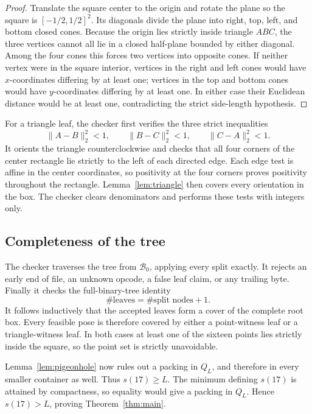 \documentclass[11pt]{article}
\theoremstyle{definition}
\theoremstyle{remark}
\newcommand{\Q}{Q}
\begin{document}
\begin{proof}
Translate the square center to the origin and rotate the plane so the square is
$[-1/2,1/2]^2$.  Its diagonals divide the plane into right, top, left, and
bottom closed cones.  Because the origin lies strictly inside triangle $ABC$,
the three vertices cannot all lie in a closed half-plane bounded by either
diagonal.  Among the four cones this forces two vertices into opposite cones.
If neither vertex were in
the square interior, vertices in the right and left cones would have
$x$-coordinates differing by at least one; vertices in the top and bottom
cones would have $y$-coordinates differing by at least one.  In either case
their Euclidean distance would be at least one, contradicting the strict
side-length hypothesis.
\end{proof}

For a triangle leaf, the checker first verifies the three strict inequalities
\[
  \lVert A-B\rVert_2^2<1,\qquad
  \lVert B-C\rVert_2^2<1,\qquad
  \lVert C-A\rVert_2^2<1.
\]
It orients the triangle counterclockwise and checks that all four corners of
the center rectangle lie strictly to the left of each directed edge.  Each
edge test is affine in the center coordinates, so positivity at the four
corners proves positivity throughout the rectangle.  Lemma~\ref{lem:triangle}
then covers every orientation in the box.  The checker clears denominators and
performs these tests with integers only.

\subsection{Completeness of the tree}

The checker traverses the tree from $\mathcal B_0$, applying every split exactly.
It rejects an early end of file, an unknown opcode, a false leaf claim, or any
trailing byte.  Finally it checks the full-binary-tree identity
\[
  \#\text{leaves}=\#\text{split nodes}+1.
\]
It follows inductively that the accepted leaves form a cover of the complete
root box.  Every feasible pose is therefore covered by either a point-witness
leaf or a triangle-witness leaf.  In both cases at least one of the sixteen
points lies strictly inside the square, so the point set is strictly
unavoidable.

Lemma~\ref{lem:pigeonhole} now rules out a packing in $\Q_L$, and therefore in
every smaller container as well.  Thus $s(17)\ge L$.  The minimum defining
$s(17)$ is attained by compactness, so equality would give a packing in
$\Q_L$.  Hence $s(17)>L$, proving Theorem~\ref{thm:main}.
\end{document}

